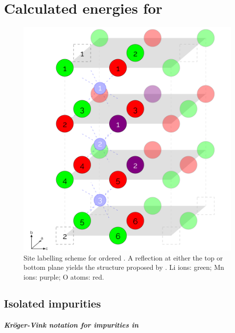 \chapter{Calculated energies for }

\begin{figure}[h]
\centering
\includegraphics[height = 0.5\textheight]{figures/orderedlabels/orderedlabels}
\caption[Repetition of Figure \ref{fig:orderedlabel} for convenience]{Site labelling scheme for ordered . A reflection at either the top or bottom plane yields the structure proposed by \citet{Diaz-Lopez2017}. Li ions: green; Mn ions: purple; O atoms: red.
}
\end{figure}

\newpage
\newpage
\section{Isolated impurities}
\paragraph{Kr\"oger-Vink notation for impurities in }

